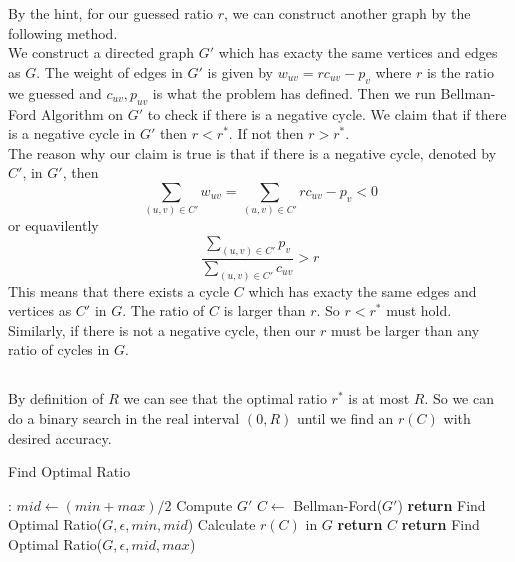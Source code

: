 \documentclass[12pt,letterpaper]{article}
\begin{document}
\section{}
\subsection{}
By the hint, for our guessed ratio $r$, we can construct another graph by the following method.\\
We construct a directed graph $G'$ which has exacty the same vertices and edges as $G$. The weight of edges in $G'$ is given by $w_{uv}=rc_{uv}-p_{v}$ where $r$ is the ratio we guessed and $c_{uv},p_{uv}$ is what the problem has defined. Then we run Bellman-Ford Algorithm on $G'$ to check if there is a negative cycle. We claim that if there is a negative cycle in $G'$ then $r<r^*$. If not then $r>r^*$.\\
The reason why our claim is true is that if there is a negative cycle, denoted by $C'$, in $G'$, then $$\sum_{(u,v)\in C'}w_{uv}=\sum_{(u,v)\in C'}rc_{uv}-p_{v}<0$$
or equavilently $$\frac{\sum_{(u,v)\in C'}p_{v}}{\sum_{(u,v)\in C'}c_{uv}}>r$$
This means that there exists a cycle $C$ which has exacty the same edges and vertices as $C'$ in $G$. The ratio of $C$ is larger than $r$. So $r<r^*$ must hold. Similarly, if there is not a negative cycle, then our $r$ must be larger than any ratio of cycles in $G$.
\subsection{}
By definition of $R$ we can see that the optimal ratio $r^*$ is at most $R$. So we can do a binary search in the real interval $(0,R)$ until we find an $r(C)$ with desired accuracy.
\begin{algorithm}
    \caption{Find Optimal Ratio}\label{alg:optratio}
    \begin{algorithmic}[1]
    :
    \State $mid\gets (min+max)/2$
    \State Compute $G'$
    \State $C\gets$ Bellman-Ford($G'$)
     {\textbf{return} Find Optimal Ratio($G,\epsilon,min,mid$)}
    \EndIf
    \State Calculate $r(C)$ in $G$
     \textbf{return} $C$ 
    \EndIf 
    \State \textbf{return} Find Optimal Ratio($G,\epsilon,mid,max$)
    \EndProcedure
    \end{algorithmic}
\end{algorithm}
\end{document}
